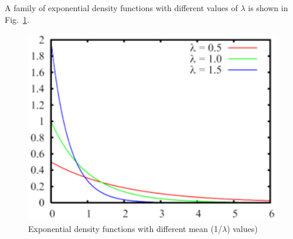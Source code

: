 A family of exponential density functions with different values of
$\lambda$ is shown in Fig.~\ref{fig:famExp}.
\begin{figure}[htb]
    \begin{center}
        \includegraphics[scale=.5]{img/jsimg/4.5.eps}
    \end{center}
    \caption{Exponential density functions with different mean (1/$\lambda$) values)}
    \label{fig:famExp}
\end{figure}\\


